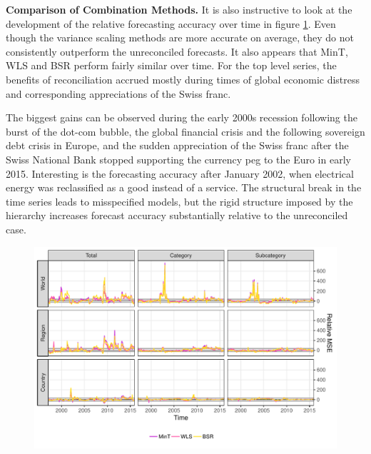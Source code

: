 \documentclass[a4paper,fleqn,11pt]{article}
\begin{document}
\noindent\textbf{Comparison of Combination Methods.} It is also instructive to look at the development of the relative forecasting accuracy over time in figure \ref{fig:rmse_time}. Even though the variance scaling methods are more accurate on average, they do not consistently outperform the unreconciled forecasts. It also appears that MinT, WLS and BSR perform fairly similar over time. For the top level series, the benefits of reconciliation accrued mostly during times of global economic distress and corresponding appreciations of the Swiss franc.

The biggest gains can be observed during the early 2000s recession following the burst of the dot-com bubble, the global financial crisis and the following sovereign debt crisis in Europe, and the sudden appreciation of the Swiss franc after the Swiss National Bank stopped supporting the currency peg to the Euro in early 2015. Interesting is the forecasting accuracy after January 2002, when electrical energy was reclassified as a good instead of a service. The structural break in the time series leads to misspecified models, but the rigid structure imposed by the hierarchy increases forecast accuracy substantially relative to the unreconciled case.

\begin{figure}[H]
	\includegraphics[width=\textwidth]{fig/fig_eval_rmse_time}
	\label{fig:rmse_time}
\end{figure}
\end{document}
